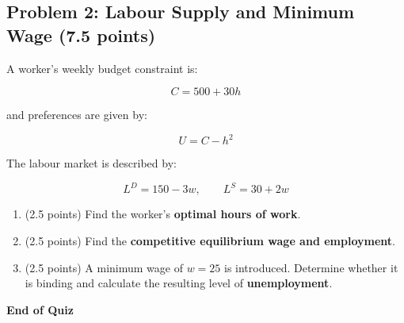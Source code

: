 \documentclass[11pt]{article}
\begin{document}
\subsection*{Problem 2: Labour Supply and Minimum Wage (7.5 points)}

A worker's weekly budget constraint is:

\[
C = 500 + 30h
\]

and preferences are given by:

\[
U = C - h^2
\]

The labour market is described by:

\[
L^D = 150 - 3w,
\qquad
L^S = 30 + 2w
\]

\begin{enumerate}
\item[(a)] (2.5 points)  
Find the worker's \textbf{optimal hours of work}.

\item[(b)] (2.5 points)  
Find the \textbf{competitive equilibrium wage and employment}.

\item[(c)] (2.5 points)  
A minimum wage of \( w = 25 \) is introduced.  
Determine whether it is binding and calculate the resulting level of \textbf{unemployment}.
\end{enumerate}

\vfill
\textbf{End of Quiz}
\end{document}
